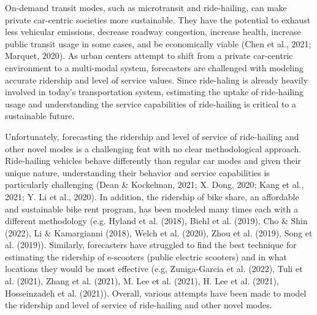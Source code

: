 \documentclass[fancy, masters]{byuthesis}
\begin{document}
On-demand transit modes, such as microtransit and ride-hailing, can make private car-centric societies more sustainable. They have the potential to exhaust less vehicular emissions, decrease roadway congestion, increase health, increase public transit usage in some cases, and be economically viable (Chen et al., 2021; Marquet, 2020). As urban centers attempt to shift from a private car-centric environment to a multi-modal system, forecasters are challenged with modeling accurate ridership and level of service values. Since ride-haling is already heavily involved in today's transportation system, estimating the uptake of ride-hailing usage and understanding the service capabilities of ride-hailing is critical to a sustainable future.

Unfortunately, forecasting the ridership and level of service of ride-hailing and other novel modes is a challenging feat with no clear methodological approach. Ride-hailing vehicles behave differently than regular car modes and given their unique nature, understanding their behavior and service capabilities is particularly challenging (Dean \& Kockelman, 2021; X. Dong, 2020; Kang et al., 2021; Y. Li et al., 2020). In addition, the ridership of bike share, an affordable and sustainable bike rent program, has been modeled many times each with a different methodology (e.g. Hyland et al. (2018), Biehl et al. (2019), Cho \& Shin (2022), Li \& Kamargianni (2018), Welch et al. (2020), Zhou et al. (2019), Song et al. (2019)). Similarly, forecasters have struggled to find the best technique for estimating the ridership of e-scooters (public electric scooters) and in what locations they would be most effective (e.g, Zuniga-Garcia et al. (2022), Tuli et al. (2021), Zhang et al. (2021), M. Lee et al. (2021), H. Lee et al. (2021), Hosseinzadeh et al. (2021)). Overall, various attempts have been made to model the ridership and level of service of ride-hailing and other novel modes.
\end{document}
